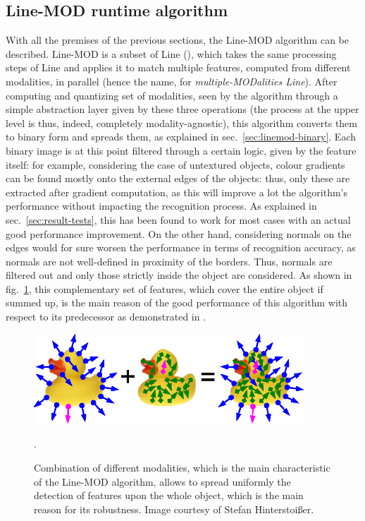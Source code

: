 \subsection{Line-MOD runtime algorithm} \label{sec:linemod-usage}
With all the premises of the previous sections, the Line-MOD algorithm
can be described. Line-MOD is a subset of Line
(\cite{linemod-origins}), which takes the same processing steps of
Line and applies it to match multiple features, computed from
different modalities, in parallel (hence the name, for
\emph{multiple-MODalities Line}). After computing and quantizing
set of modalities, seen by the algorithm through a simple abstraction
layer given by these three operations (the process at the upper level
is thus, indeed, completely modality-agnostic), this algorithm
converts them to binary form and spreads them, as explained in
sec.~\ref{sec:linemod-binary}. Each binary image is at this point filtered
through a certain logic, given by the feature itself: for example,
considering the case of untextured objects, colour gradients can be
found mostly onto the external edges of the objects: thus, only these
are extracted after gradient computation, as this will improve a lot
the algorithm's performance without impacting the recognition
process. As explained in sec.~\ref{sec:result-tests}, this has been
found to work for most cases with an actual good performance improvement.
On the other hand, considering normals on the edges would for sure
worsen the performance in terms of recognition accuracy, as normals
are not well-defined in proximity of the borders. Thus, normals are
filtered out and only those strictly inside the object are
considered. As shown in fig.~\ref{fig:duck-linemod}, this
complementary set of features, which cover the entire object if summed
up, is the main reason of the good performance of this algorithm with
respect to its predecessor as demonstrated in \cite{linemod-paper}.

\begin{figure}[htbp]
\centering
\includegraphics[width=4in]{./Graphics/duck-linemod}
\caption{Combination of different modalities, which is the main
  characteristic of the Line-MOD algorithm, allows to spread uniformly
  the detection of features upon the whole object, which is the main
  reason for its robustness. Image courtesy of Stefan Hinterstoi\ss er. \label{fig:duck-linemod}}.
\end{figure}

